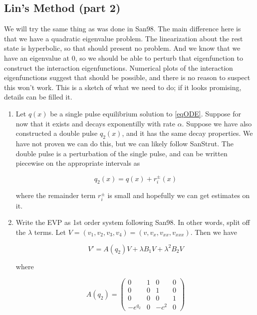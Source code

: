 \documentclass[12pt]{article}
\begin{document}
\subsection{Lin's Method (part 2)}

We will try the same thing as was done in San98. The main difference here is that we have a quadratic eigenvalue problem. The linearization about the rest state is hyperbolic, so that should present no problem. And we know that we have an eigenvalue at 0, so we should be able to perturb that eigenfunction to construct the interaction eigenfunctions. Numerical plots of the interaction eigenfunctions suggest that should be possible, and there is no reason to suspect this won't work. This is a sketch of what we need to do; if it looks promising, details can be filled it.

\begin{enumerate}

\item Let $q(x)$ be a single pulse equilibrium solution to \eqref{eqODE}. Suppose for now that it exists and decays exponentilly with rate $\alpha$. Suppose we have also constructed a double pulse $q_2(x)$, and it has the same decay properties. We have not proven we can do this, but we can likely follow SanStrut. The double pulse is a perturbation of the single pulse, and can be written piecewise on the appropriate intervals as

\[
q_2(x) = q(x) + r_i^\pm(x)
\]

where the remainder term $r_i^\pm$ is small and hopefully we can get estimates on it.

\item Write the EVP as 1st order system following San98. In other words, split off the $\lambda$ terms. Let $V = (v_1, v_2, v_3, v_4) = (v, v_x, v_{xx}, v_{xxx})$. Then we have

\begin{equation}\label{splitevp}
V' = A(q_2)V + \lambda B_1 V + \lambda^2 B_2 V
\end{equation}

where

\begin{equation}
A(q_2) = \begin{pmatrix}
0 & 1 & 0 & 0 \\
0 & 0 & 1 & 0 \\
0 & 0 & 0 & 1 \\
-e^{q_2} & 0 & -c^2 & 0 
\end{pmatrix}
\end{equation}


\end{enumerate}
\end{document}
